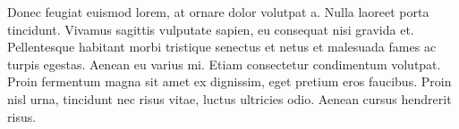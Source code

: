 Donec feugiat euismod lorem, at ornare dolor volutpat a. Nulla laoreet porta tincidunt. Vivamus sagittis vulputate sapien, eu consequat nisi gravida et. Pellentesque habitant morbi tristique senectus et netus et malesuada fames ac turpis egestas. Aenean eu varius mi. Etiam consectetur condimentum volutpat. Proin fermentum magna sit amet ex dignissim, eget pretium eros faucibus. Proin nisl urna, tincidunt nec risus vitae, luctus ultricies odio. Aenean cursus hendrerit risus.